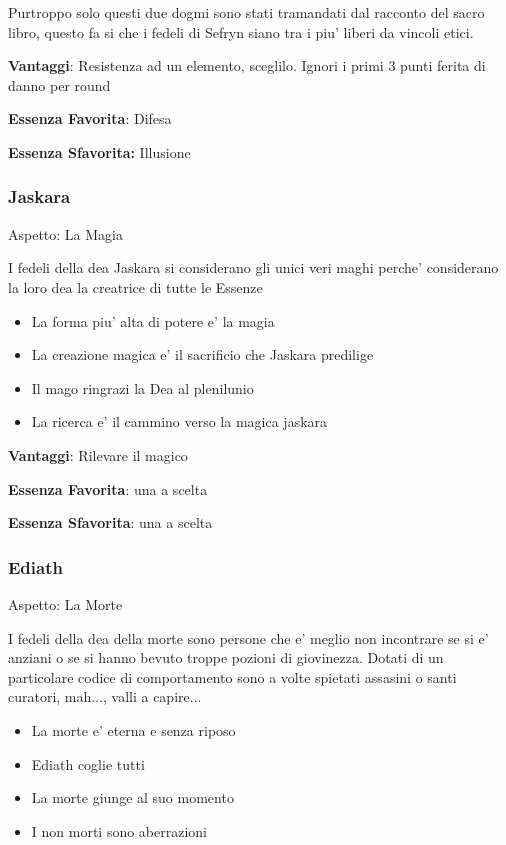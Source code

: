 \documentclass[a4paper,11pt,twoside,openany]{book}
\begin{document}
Purtroppo solo questi due dogmi sono stati tramandati dal racconto del sacro libro, questo fa si che i fedeli di Sefryn siano tra i piu' liberi da vincoli etici.


\textbf{Vantaggi}: Resistenza ad un elemento, sceglilo. Ignori i primi 3 punti ferita di danno per round

\textbf{Essenza Favorita}: Difesa

\textbf{Essenza Sfavorita:} Illusione

\bigskip

\subsubsection{Jaskara}

Aspetto: La Magia
\bigskip


I fedeli della dea Jaskara si considerano gli unici veri maghi perche' considerano la loro dea la creatrice di tutte le Essenze

\begin{itemize}
	\item La forma piu' alta di potere e' la magia
	\item La creazione magica e' il sacrificio che Jaskara predilige
	\item Il mago ringrazi la Dea al plenilunio 
	\item La ricerca e' il cammino verso la magica jaskara
\end{itemize}


\textbf{Vantaggi}: Rilevare il magico

\textbf{Essenza Favorita}: una a scelta

\textbf{Essenza Sfavorita}: una a scelta
\bigskip

\subsubsection{Ediath}

Aspetto: La Morte
\bigskip


I fedeli della dea della morte sono persone che e' meglio non incontrare se si e' anziani o se si hanno bevuto troppe pozioni di giovinezza. Dotati di un particolare codice di comportamento sono a volte spietati assasini o santi curatori, mah..., valli a capire...

\begin{itemize}
	\item La morte e' eterna e senza riposo
	\item Ediath coglie tutti
	\item La morte giunge al suo momento
	\item I non morti sono aberrazioni
\end{itemize}
\end{document}
